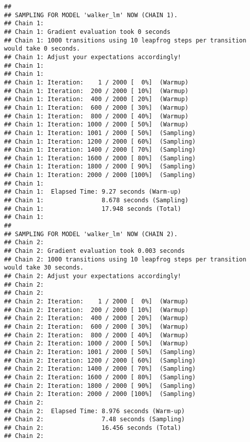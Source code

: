 \documentclass[
]{book}
\newenvironment{Shaded}{\begin{snugshade}}{\end{snugshade}}
\newcommand{\AttributeTok}[1]{\textcolor[rgb]{0.77,0.63,0.00}{#1}}
\newcommand{\CommentTok}[1]{\textcolor[rgb]{0.56,0.35,0.01}{\textit{#1}}}
\newcommand{\DecValTok}[1]{\textcolor[rgb]{0.00,0.00,0.81}{#1}}
\newcommand{\FloatTok}[1]{\textcolor[rgb]{0.00,0.00,0.81}{#1}}
\newcommand{\FunctionTok}[1]{\textcolor[rgb]{0.00,0.00,0.00}{#1}}
\newcommand{\NormalTok}[1]{#1}
\newcommand{\SpecialCharTok}[1]{\textcolor[rgb]{0.00,0.00,0.00}{#1}}
\newcommand{\StringTok}[1]{\textcolor[rgb]{0.31,0.60,0.02}{#1}}
\begin{document}
\begin{verbatim}
## 
## SAMPLING FOR MODEL 'walker_lm' NOW (CHAIN 1).
## Chain 1: 
## Chain 1: Gradient evaluation took 0 seconds
## Chain 1: 1000 transitions using 10 leapfrog steps per transition would take 0 seconds.
## Chain 1: Adjust your expectations accordingly!
## Chain 1: 
## Chain 1: 
## Chain 1: Iteration:    1 / 2000 [  0%]  (Warmup)
## Chain 1: Iteration:  200 / 2000 [ 10%]  (Warmup)
## Chain 1: Iteration:  400 / 2000 [ 20%]  (Warmup)
## Chain 1: Iteration:  600 / 2000 [ 30%]  (Warmup)
## Chain 1: Iteration:  800 / 2000 [ 40%]  (Warmup)
## Chain 1: Iteration: 1000 / 2000 [ 50%]  (Warmup)
## Chain 1: Iteration: 1001 / 2000 [ 50%]  (Sampling)
## Chain 1: Iteration: 1200 / 2000 [ 60%]  (Sampling)
## Chain 1: Iteration: 1400 / 2000 [ 70%]  (Sampling)
## Chain 1: Iteration: 1600 / 2000 [ 80%]  (Sampling)
## Chain 1: Iteration: 1800 / 2000 [ 90%]  (Sampling)
## Chain 1: Iteration: 2000 / 2000 [100%]  (Sampling)
## Chain 1: 
## Chain 1:  Elapsed Time: 9.27 seconds (Warm-up)
## Chain 1:                8.678 seconds (Sampling)
## Chain 1:                17.948 seconds (Total)
## Chain 1: 
## 
## SAMPLING FOR MODEL 'walker_lm' NOW (CHAIN 2).
## Chain 2: 
## Chain 2: Gradient evaluation took 0.003 seconds
## Chain 2: 1000 transitions using 10 leapfrog steps per transition would take 30 seconds.
## Chain 2: Adjust your expectations accordingly!
## Chain 2: 
## Chain 2: 
## Chain 2: Iteration:    1 / 2000 [  0%]  (Warmup)
## Chain 2: Iteration:  200 / 2000 [ 10%]  (Warmup)
## Chain 2: Iteration:  400 / 2000 [ 20%]  (Warmup)
## Chain 2: Iteration:  600 / 2000 [ 30%]  (Warmup)
## Chain 2: Iteration:  800 / 2000 [ 40%]  (Warmup)
## Chain 2: Iteration: 1000 / 2000 [ 50%]  (Warmup)
## Chain 2: Iteration: 1001 / 2000 [ 50%]  (Sampling)
## Chain 2: Iteration: 1200 / 2000 [ 60%]  (Sampling)
## Chain 2: Iteration: 1400 / 2000 [ 70%]  (Sampling)
## Chain 2: Iteration: 1600 / 2000 [ 80%]  (Sampling)
## Chain 2: Iteration: 1800 / 2000 [ 90%]  (Sampling)
## Chain 2: Iteration: 2000 / 2000 [100%]  (Sampling)
## Chain 2: 
## Chain 2:  Elapsed Time: 8.976 seconds (Warm-up)
## Chain 2:                7.48 seconds (Sampling)
## Chain 2:                16.456 seconds (Total)
## Chain 2:
\end{verbatim}

\begin{Shaded}
\end{Shaded}
\end{document}
